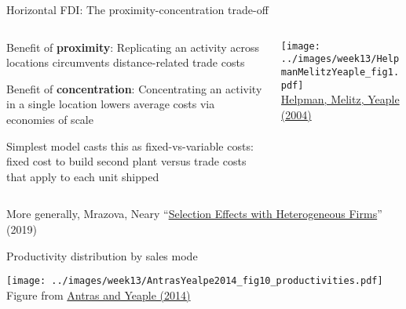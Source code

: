 \documentclass[11pt,notes=hide,aspectratio=169]{beamer}
\begin{document}
\begin{frame}{Horizontal FDI: The proximity-concentration trade-off}
\begin{columns}
\begin{column}{0.46\textwidth}
\begin{itemize}{\small
\item Benefit of \textbf{proximity}: Replicating an activity across locations circumvents distance-related trade costs\\
\item Benefit of \textbf{concentration}: Concentrating an activity in a single location lowers average costs via economies of scale
\item {Simplest model casts this as fixed-vs-variable costs:
fixed cost to build second plant versus trade costs that apply to each unit shipped\par}
}\end{itemize}
\end{column}
\begin{column}{0.52\textwidth}\begin{center}
\texttt{[image: ../images/week13/HelpmanMelitzYeaple\_fig1.pdf]}\\
{\scriptsize \href{https://www.aeaweb.org/articles?id=10.1257/000282804322970814}{Helpman, Melitz, Yeaple (2004)}}
\end{center}\end{column}
\end{columns}
\vspace{2mm}
{\small More generally,
Mrazova, Neary ``\href{https://doi.org/10.1093/jeea/jvy024}{Selection Effects with Heterogeneous Firms}'' (2019)}
\end{frame}
\begin{frame}{Productivity distribution by sales mode}
\begin{center}
\texttt{[image: ../images/week13/AntrasYealpe2014\_fig10\_productivities.pdf]}\\ \vspace{-2mm}
{\footnotesize Figure from \href{http://scholar.harvard.edu/antras/publications/multinational-firms-and-structure-international-trade}{Antras and Yeaple (2014)}}
\end{center}
\end{frame}
\end{document}
